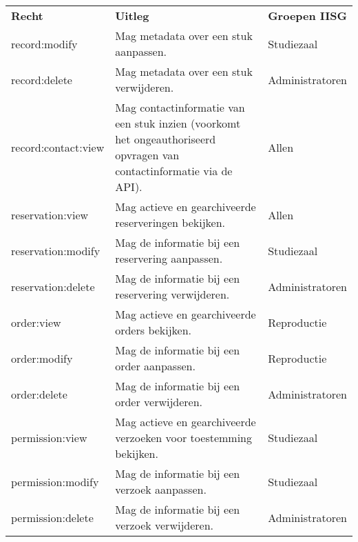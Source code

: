 \documentclass[a4paper,titlepage]{report}
\begin{document}
  \begin{center}
  \begin{tabular}{l p{8cm} l}
    \textbf{Recht} & \textbf{Uitleg} & \textbf{Groepen IISG} \\
      record:modify
      & Mag metadata over een stuk aanpassen.
      & Studiezaal
    \\

      record:delete
      & Mag metadata over een stuk verwijderen.
      & Administratoren
    \\

      record:contact:view
      & Mag contactinformatie van een stuk inzien (voorkomt het ongeauthoriseerd
      opvragen van contactinformatie via de API).
      & Allen
    \\

    reservation:view
      & Mag actieve en gearchiveerde reserveringen bekijken.
      & Allen
    \\

    reservation:modify
      & Mag de informatie bij een reservering aanpassen.
      & Studiezaal
    \\

    reservation:delete
      & Mag de informatie bij een reservering verwijderen.
      & Administratoren
    \\

    order:view
      & Mag actieve en gearchiveerde orders bekijken.
      & Reproductie
    \\

    order:modify
      & Mag de informatie bij een order aanpassen.
      & Reproductie
    \\

    order:delete
      & Mag de informatie bij een order verwijderen.
      & Administratoren
    \\

    permission:view
      & Mag actieve en gearchiveerde verzoeken voor toestemming bekijken.
      & Studiezaal
    \\

    permission:modify
      & Mag de informatie bij een verzoek aanpassen.
      & Studiezaal
    \\

    permission:delete
      & Mag de informatie bij een verzoek verwijderen.
      & Administratoren
    \\
  \end{tabular}
  \end{center}
  
\end{document}
